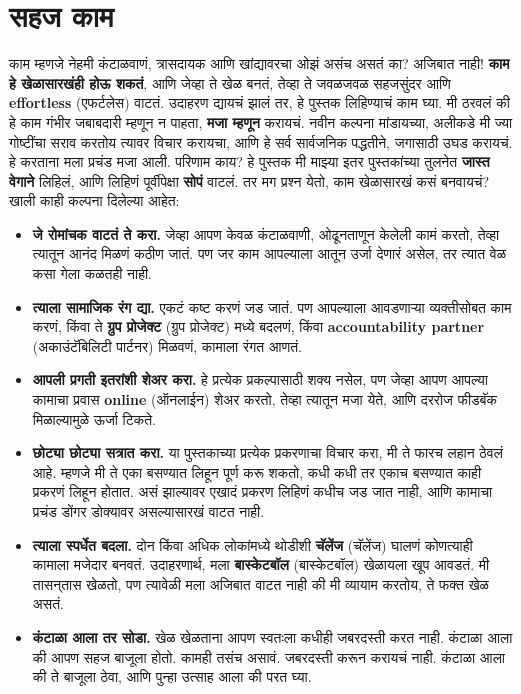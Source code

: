  \chapter{सहज काम}
काम म्हणजे नेहमी कंटाळवाणं, त्रासदायक आणि खांद्यावरचा ओझं असंच असतं का? अजिबात नाही! \textbf{काम हे खेळासारखंही होऊ शकतं}, आणि जेव्हा ते खेळ बनतं, तेव्हा ते जवळजवळ सहजसुंदर आणि \textbf{effortless} (एफर्टलेस) वाटतं.
उदाहरण द्यायचं झालं तर, हे पुस्तक लिहिण्याचं काम घ्या. मी ठरवलं की हे काम गंभीर जबाबदारी म्हणून न पाहता, \textbf{मजा म्हणून} करायचं. नवीन कल्पना मांडायच्या, अलीकडे मी ज्या गोष्टींचा सराव करतोय त्यावर विचार करायचा, आणि हे सर्व सार्वजनिक पद्धतीने, जगासाठी उघड करायचं. हे करताना मला प्रचंड मजा आली.
 परिणाम काय? हे पुस्तक मी माझ्या इतर पुस्तकांच्या तुलनेत \textbf{जास्त वेगाने} लिहिलं, आणि लिहिणं पूर्वीपेक्षा \textbf{सोपं} वाटलं.
तर मग प्रश्न येतो, काम खेळासारखं कसं बनवायचं? खाली काही कल्पना दिलेल्या आहेत:
\begin{itemize}
 \item \textbf{जे रोमांचक वाटतं ते करा.} जेव्हा आपण केवळ कंटाळवाणी, ओढूनताणून केलेली कामं करतो,
 तेव्हा त्यातून आनंद मिळणं कठीण जातं. पण जर काम आपल्याला आतून उर्जा देणारं असेल, तर त्यात वेळ कसा गेला कळतही नाही.
\item \textbf{त्याला सामाजिक रंग द्या.} एकटं कष्ट करणं जड जातं. पण आपल्याला आवडणाऱ्या व्यक्तीसोबत काम करणं, किंवा ते \textbf{ग्रुप प्रोजेक्ट} (ग्रुप प्रोजेक्ट) मध्ये बदलणं, किंवा \textbf{accountability partner} (अकाउंटॅबिलिटी पार्टनर) मिळवणं, कामाला रंगत आणतं.
\item \textbf{आपली प्रगती इतरांशी शेअर करा.} हे प्रत्येक प्रकल्पासाठी शक्य नसेल, पण जेव्हा आपण आपल्या कामाचा प्रवास \textbf{online} (ऑनलाईन) शेअर करतो, तेव्हा त्यातून मजा येते, आणि दररोज फीडबॅक मिळाल्यामुळे ऊर्जा टिकते.
\item \textbf{छोट्या छोट्या सत्रात करा.} या पुस्तकाच्या प्रत्येक प्रकरणाचा विचार करा,  मी ते फारच लहान ठेवलं आहे. म्हणजे मी ते एका बसण्यात लिहून पूर्ण करू शकतो, कधी कधी तर एकाच बसण्यात काही प्रकरणं लिहून होतात. असं झाल्यावर एखादं प्रकरण लिहिणं कधीच जड जात नाही, आणि कामाचा प्रचंड डोंगर डोक्यावर असल्यासारखं वाटत नाही.
\item \textbf{त्याला स्पर्धेत बदला.} दोन किंवा अधिक लोकांमध्ये थोडीशी \textbf{चॅलेंज} (चॅलेंज) घालणं कोणत्याही कामाला मजेदार बनवतं. उदाहरणार्थ, मला \textbf{बास्केटबॉल} (बास्केटबॉल) खेळायला खूप आवडतं.
 मी तासन्‌तास खेळतो, पण त्यावेळी मला अजिबात वाटत नाही की मी व्यायाम करतोय,  ते फक्त खेळ असतं.
\item \textbf{कंटाळा आला तर सोडा.} खेळ खेळताना आपण स्वतःला कधीही जबरदस्ती करत नाही. कंटाळा आला की आपण सहज बाजूला होतो. कामही तसंच असावं. जबरदस्ती करून करायचं नाही. कंटाळा आला की ते बाजूला ठेवा, आणि पुन्हा उत्साह आला की परत घ्या.
 \end{itemize}
